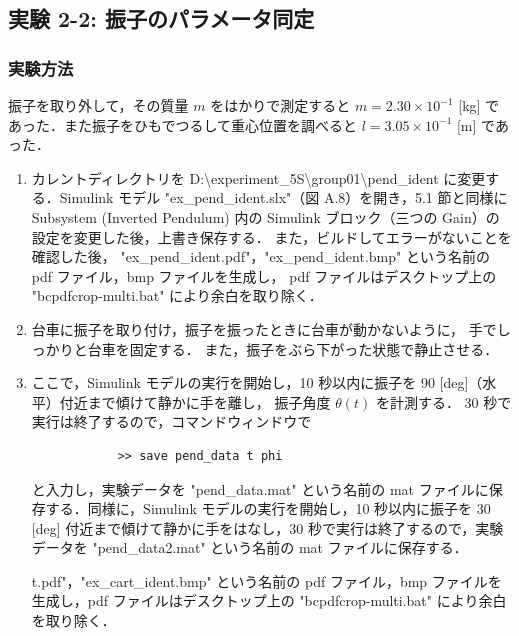 \subsection{実験 2-2: 振子のパラメータ同定}
\subsubsection{実験方法}

振子を取り外して，その質量 \( m \) をはかりで測定すると \( m = 2.30 \times 10^{-1} \) [kg] であった．また振子をひもでつるして重心位置を調べると \( l = 3.05 \times 10^{-1} \) [m] であった．

\begin{enumerate}
  \item カレントディレクトリを D:\textbackslash experiment\_5S\textbackslash group01\textbackslash pend\_ident に変更する．Simulink モデル "ex\_pend\_ident.slx"（図 A.8）を開き，5.1 節と同様に Subsystem (Inverted Pendulum) 内の Simulink ブロック（三つの Gain）の設定を変更した後，上書き保存する．
        また，ビルドしてエラーがないことを確認した後，
        "ex\_pend\_ident.pdf"，"ex\_pend\_ident.bmp" 
        という名前の pdf ファイル，bmp ファイルを生成し，
        pdf ファイルはデスクトップ上の "bcpdfcrop-multi.bat" 
        により余白を取り除く．
        
  \item 台車に振子を取り付け，振子を振ったときに台車が動かないように，
        手でしっかりと台車を固定する．
        また，振子をぶら下がった状態で静止させる．
        
  \item ここで，Simulink モデルの実行を開始し，10 秒以内に振子を 90 [deg]（水平）付近まで傾けて静かに手を離し，
        振子角度 \( \theta(t) \) を計測する．
        30 秒で実行は終了するので，コマンドウィンドウで
        \begin{tcolorbox}[colback=gray!5!white,colframe=gray!75!black]
          \begin{lstlisting}
            >> save pend_data t phi
            \end{lstlisting}
        \end{tcolorbox}
        と入力し，実験データを "pend\_data.mat" という名前の mat ファイルに保存する．同様に，Simulink モデルの実行を開始し，10 秒以内に振子を 30 [deg] 付近まで傾けて静かに手をはなし，30 秒で実行は終了するので，実験データを "pend\_data2.mat" という名前の mat ファイルに保存する．
        
        t.pdf"，"ex\_cart\_ident.bmp" という名前の pdf ファイル，bmp ファイルを生成し，pdf ファイルはデスクトップ上の "bcpdfcrop-multi.bat" により余白を取り除く．
\end{enumerate}

